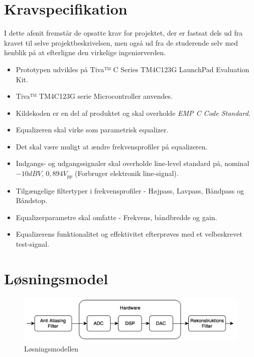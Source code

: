 \section{Kravspecifikation} \label{afs:kravspecifikation}
I dette afsnit fremstår de opsatte krav for projektet, der er fastsat dels ud fra kravet til selve projektbeskrivelsen, men også ud fra de studerende selv med henblik på at efterligne den virkelige ingeniørverden.

\begin{itemize}[noitemsep,nolistsep]
	\item Prototypen udvikles på Tiva™ C Series TM4C123G LaunchPad Evaluation Kit.
	\item Tiva™ TM4C123G serie Microcontroller anvendes.
	\item Kildekoden er en del af produktet og skal overholde \textit{EMP C Code Standard}\cite{emp-c}.
	\item Equalizeren skal virke som parametrisk equalizer.
	\item Det skal være muligt at ændre frekvensprofiler på equalizeren.
	\item Indgangs- og udgangssignaler skal overholde line-level standard på, nominal $-10 dBV$, $0,894 V_{pp}$ (Forbruger elektronik line-signal).
	\item Tilgængelige filtertyper i frekvensprofiler - Højpass, Lavpass, Båndpass og Båndstop.
	\item Equalizerparametre skal omfatte - Frekvens, båndbredde og gain.
	\item Equalizerens funktionalitet og effektivitet efterprøves med et velbeskrevet test-signal.
\end{itemize}

\section{Løsningsmodel}

\begin{figure}[h]
	\centering
	\includegraphics[width=0.8\linewidth]{billeder/flow_losn}
	\caption{Løsningsmodellen}
	\label{fig:losningsmodel}
\end{figure}

